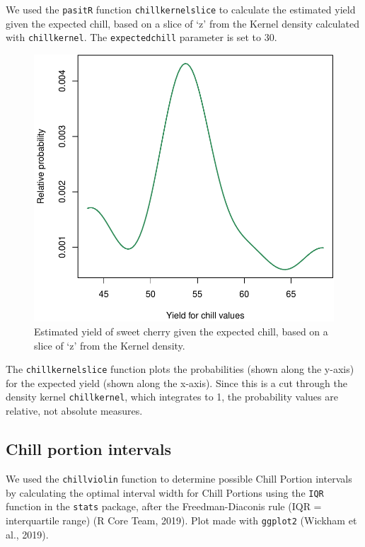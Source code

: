 \documentclass[]{article}
\begin{document}
We used the \texttt{pasitR} function \texttt{chillkernelslice} to
calculate the estimated yield given the expected chill, based on a slice
of `z' from the Kernel density calculated with \texttt{chillkernel}. The
\texttt{expectedchill} parameter is set to 30.

\begin{figure}
\centering
\includegraphics{Abstract_SHE_Chill_Yield_Model_files/figure-latex/unnamed-chunk-4-1.pdf}
\caption{Estimated yield of sweet cherry given the expected chill, based
on a slice of `z' from the Kernel density.}
\end{figure}

The \texttt{chillkernelslice} function plots the probabilities (shown
along the y-axis) for the expected yield (shown along the x-axis). Since
this is a cut through the density kernel \texttt{chillkernel}, which
integrates to 1, the probability values are relative, not absolute
measures.

\hypertarget{chill-portion-intervals}{%
\subsection{Chill portion intervals}\label{chill-portion-intervals}}

We used the \texttt{chillviolin} function to determine possible Chill
Portion intervals by calculating the optimal interval width for Chill
Portions using the \texttt{IQR} function in the \texttt{stats} package,
after the Freedman-Diaconis rule (IQR = interquartile range) (R Core
Team, 2019). Plot made with \texttt{ggplot2} (Wickham et al., 2019).
\end{document}
